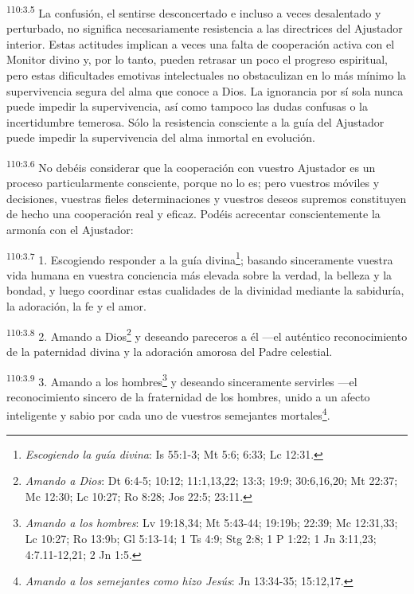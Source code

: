 \par
\textsuperscript{110:3.5} La confusión, el sentirse desconcertado e incluso a veces desalentado y perturbado, no significa necesariamente resistencia a las directrices del Ajustador interior. Estas actitudes implican a veces una falta de cooperación activa con el Monitor divino y, por lo tanto, pueden retrasar un poco el progreso espiritual, pero estas dificultades emotivas intelectuales no obstaculizan en lo más mínimo la supervivencia segura del alma que conoce a Dios. La ignorancia por sí sola nunca puede impedir la supervivencia, así como tampoco las dudas confusas o la incertidumbre temerosa. Sólo la resistencia consciente a la guía del Ajustador puede impedir la supervivencia del alma inmortal en evolución.

\par
\textsuperscript{110:3.6} No debéis considerar que la cooperación con vuestro Ajustador es un proceso particularmente consciente, porque no lo es; pero vuestros móviles y decisiones, vuestras fieles determinaciones y vuestros deseos supremos constituyen de hecho una cooperación real y eficaz. Podéis acrecentar conscientemente la armonía con el Ajustador:

\par
\textsuperscript{110:3.7} 1. Escogiendo responder a la guía divina\footnote{\textit{Escogiendo la guía divina}: Is 55:1-3; Mt 5:6; 6:33; Lc 12:31.}; basando sinceramente vuestra vida humana en vuestra conciencia más elevada sobre la verdad, la belleza y la bondad, y luego coordinar estas cualidades de la divinidad mediante la sabiduría, la adoración, la fe y el amor.

\par
\textsuperscript{110:3.8} 2. Amando a Dios\footnote{\textit{Amando a Dios}: Dt 6:4-5; 10:12; 11:1,13,22; 13:3; 19:9; 30:6,16,20; Mt 22:37; Mc 12:30; Lc 10:27; Ro 8:28; Jos 22:5; 23:11.} y deseando pareceros a él ---el auténtico reconocimiento de la paternidad divina y la adoración amorosa del Padre celestial.

\par
\textsuperscript{110:3.9} 3. Amando a los hombres\footnote{\textit{Amando a los hombres}: Lv 19:18,34; Mt 5:43-44; 19:19b; 22:39; Mc 12:31,33; Lc 10:27; Ro 13:9b; Gl 5:13-14; 1 Ts 4:9; Stg 2:8; 1 P 1:22; 1 Jn 3:11,23; 4:7.11-12,21; 2 Jn 1:5.} y deseando sinceramente servirles ---el reconocimiento sincero de la fraternidad de los hombres, unido a un afecto inteligente y sabio por cada uno de vuestros semejantes mortales\footnote{\textit{Amando a los semejantes como hizo Jesús}: Jn 13:34-35; 15:12,17.}.

